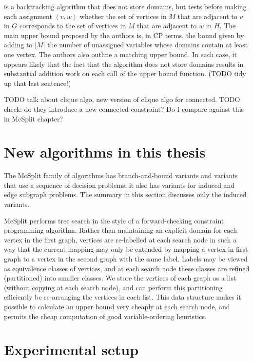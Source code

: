 \citet{cao2008maximum} is a backtracking algorithm that does not store domains,
but tests before making each assignment $(v,w)$ whether the set of vertices in $M$
that are adjacent to $v$ in $G$ corresponds to the set of vertices in $M$ that
are adjacent to $w$ in $H$.  The main upper bound proposed by the authors
is, in CP terms, the bound given by adding to $|M|$ the number of unassigned
variables whose domains contain at least one vertex.  The authors also outline
a matching upper bound.  In each case, it appears likely that the fact that the algorithm does not
store domains results in substantial addition work on each call of the upper bound
function.  (TODO tidy up that last sentence!)

\citet{DBLP:conf/cp/McCreeshNPS16} TODO talk about clique algo, new version
of clique algo for connected. TODO check: do they introduce a new connected
constraint? Do I compare against this in McSplit chapter?

\section{New algorithms in this thesis}

The McSplit family of algorithms has branch-and-bound variants and variants
that use a sequence of decision problems; it also has variants for induced and
edge subgraph problems. The summary in this section discusses only the induced
variants.

McSplit performs tree search in the style of a forward-checking constraint
programming algorithm. Rather than maintaining an explicit domain for each
vertex in the first graph, vertices are re-labelled at each search node in such
a way that the current mapping may only be extended by mapping a vertex in
first graph to a vertex in the second graph with the same label. Labels may be
viewed as equivalence classes of vertices, and at each search node these
classes are refined (partitioned) into smaller classes. We store the vertices
of each graph as a list (without copying at each search node), and can perform
this partitioning efficiently be re-arranging the vertices in each list. This
data structure makes it possible to calculate an upper bound very cheaply at
each search node, and permits the cheap computation of good variable-ordering
heuristics.

\section{Experimental setup}

